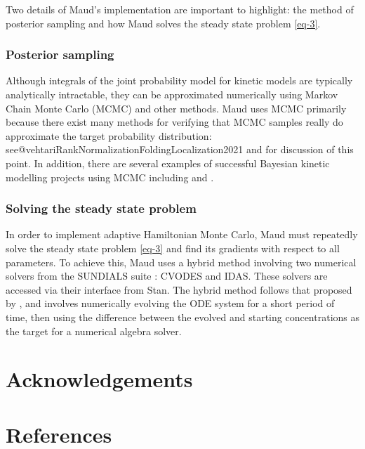 \documentclass[journal=,manuscript=]{achemso}
\begin{document}
Two details of Maud's implementation are important to highlight: the
method of posterior sampling and how Maud solves the steady state
problem \eqref{eq-3}.

\hypertarget{posterior-sampling}{%
\subsubsection{Posterior sampling}\label{posterior-sampling}}

Although integrals of the joint probability model for kinetic models are
typically analytically intractable, they can be approximated numerically
using Markov Chain Monte Carlo (MCMC) and other methods. Maud uses MCMC
primarily because there exist many methods for verifying that MCMC
samples really do approximate the target probability distribution:
see@vehtariRankNormalizationFoldingLocalization2021 and
\citet{taltsValidatingBayesianInference2018} for discussion of this
point. In addition, there are several examples of successful Bayesian
kinetic modelling projects using MCMC including
\citet{st.johnBayesianInferenceMetabolic2018} and
\citet{xingModelingKineticsLargescale2010}.

\hypertarget{solving-the-steady-state-problem}{%
\subsubsection{Solving the steady state
problem}\label{solving-the-steady-state-problem}}

In order to implement adaptive Hamiltonian Monte Carlo, Maud must
repeatedly solve the steady state problem \eqref{eq-3} and find its
gradients with respect to all parameters. To achieve this, Maud uses a
hybrid method involving two numerical solvers from the SUNDIALS suite
\citep{serbanCVODESSensitivityEnabledODE2005}: CVODES and IDAS. These
solvers are accessed via their interface from Stan. The hybrid method
follows that proposed by \citet{margossianComputingSteadyStates2018},
and involves numerically evolving the ODE system for a short period of
time, then using the difference between the evolved and starting
concentrations as the target for a numerical algebra solver.

\hypertarget{acknowledgements}{%
\section{Acknowledgements}\label{acknowledgements}}

\hypertarget{references}{%
\section{References}\label{references}}

\renewcommand{\bibsection}{}

\end{document}
